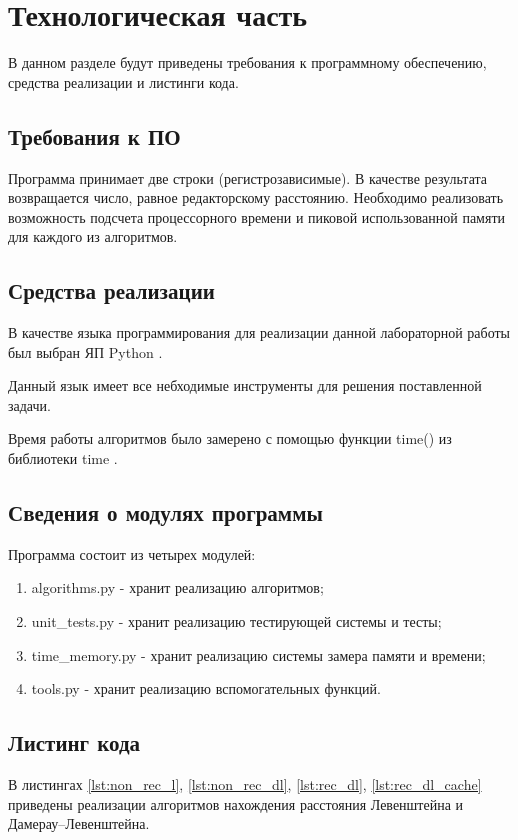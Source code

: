 \chapter{Технологическая часть}

В данном разделе будут приведены требования к программному обеспечению, средства реализации и листинги кода.

\section{Требования к ПО}

Программа принимает две строки (регистрозависимые). В качестве результата возвращается число, равное редакторскому расстоянию. Необходимо реализовать возможность подсчета процессорного времени и пиковой использованной памяти для каждого из алго­ритмов.

\section{Средства реализации}

В качестве языка программирования для реализации данной лабораторной работы был выбран ЯП Python \cite{pythonlang}. 

Данный язык имеет все небходимые инструменты для решения поставленной задачи.

Время работы алгоритмов было замерено с помощью функции time() из библиотеки time \cite{pythonlangtime}.

\section{Сведения о модулях программы}
Программа состоит из четырех модулей:
\begin{enumerate}
	\item algorithms.py - хранит реализацию алгоритмов;
	\item unit\_tests.py - хранит реализацию тестирующей системы и тесты;
	\item time\_memory.py - хранит реализацию системы замера памяти и времени;
	\item tools.py - хранит реализацию вспомогательных функций.
\end{enumerate}


\section{Листинг кода}

 В листингах \ref{lst:non_rec_l}, \ref{lst:non_rec_dl}, \ref{lst:rec_dl}, \ref{lst:rec_dl_cache} приведены реализации алгоритмов нахождения расстояния Левенштейна и Дамерау--Левенштейна.

